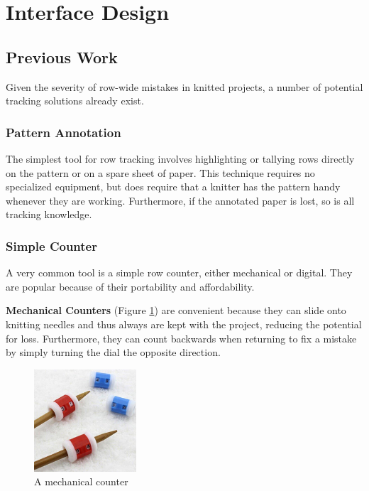 \documentclass[11pt,twocolumn]{article}
\begin{document}
\section{Interface Design} \label{design}

\subsection{Previous Work} \label{prev}

Given the severity of row-wide mistakes in knitted projects, a number of potential tracking solutions already exist.

\subsubsection{Pattern Annotation} \label{annotation}

The simplest tool for row tracking involves highlighting or tallying rows directly on the pattern or on a spare sheet of paper.
This technique requires no specialized equipment, but does require that a knitter has the pattern handy whenever they are working.
Furthermore, if the annotated paper is lost, so is all tracking knowledge.

\subsubsection{Simple Counter} \label{counters}

A very common tool is a simple row counter, either mechanical or digital. They are popular because of their portability and affordability.

\textbf{Mechanical Counters} (Figure \ref{mechanical}) are convenient because they can slide onto knitting needles and thus always are kept with the project, reducing the potential for loss.
Furthermore, they can count backwards when returning to fix a mistake by simply turning the dial the opposite direction.
\begin{figure}
  \begin{center}
    \includegraphics[width=1.5in]{rowCounter}
    \caption{A mechanical counter} \label{mechanical}
  \end{center}
\end{figure}
\end{document}
